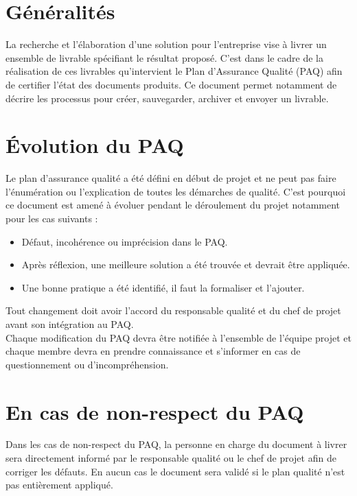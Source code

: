 
\section{Généralités}

La recherche et l’élaboration d’une solution pour l’entreprise vise à livrer un ensemble de livrable spécifiant le résultat proposé. C’est dans le cadre de la réalisation de ces livrables qu’intervient le Plan d'Assurance Qualité (PAQ) afin de certifier l’état des documents produits. Ce document permet notamment de décrire les processus pour créer, sauvegarder, archiver et envoyer un livrable.

\section{Évolution du PAQ}

Le plan d’assurance qualité a été défini en début de projet et ne peut pas faire l’énumération ou l’explication de toutes les démarches de qualité. C’est pourquoi ce document est amené à évoluer pendant le déroulement du projet notamment pour les cas suivants : \\

\begin{itemize}
    \item[\textbullet] Défaut, incohérence ou imprécision dans le PAQ.
    \item[\textbullet] Après réflexion, une meilleure solution a été trouvée et devrait être appliquée.
    \item[\textbullet] Une bonne pratique a été identifié, il faut la formaliser et l’ajouter. \\
\end{itemize}

Tout changement doit avoir l’accord du responsable qualité et du chef de projet avant son intégration au PAQ. \\

Chaque modification du PAQ devra être notifiée à l’ensemble de l’équipe projet et chaque membre devra en prendre connaissance et s’informer en cas de questionnement ou d’incompréhension.
    
\section{En cas de non-respect du PAQ}
    
Dans les cas de non-respect du PAQ, la personne en charge du document à livrer sera directement informé par le responsable qualité ou le chef de projet afin de corriger les défauts. En aucun cas le document sera validé si le plan qualité n’est pas entièrement appliqué. \\

